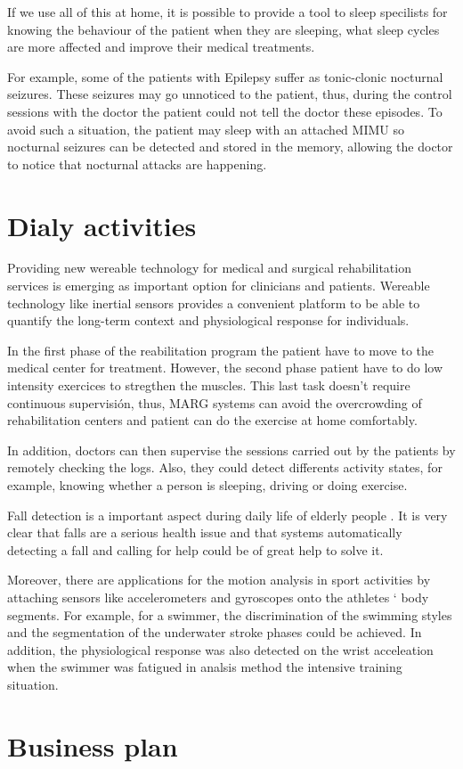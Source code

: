 If we use all of this at home, it is possible to provide a tool to sleep specilists for knowing the behaviour of the patient when they are sleeping, what sleep cycles are more affected and improve their medical  treatments. 

For example,  some of the patients with Epilepsy suffer as tonic-clonic nocturnal seizures. These seizures  may go unnoticed to the patient, thus, during the control sessions with the doctor the patient could not tell the doctor these episodes. To avoid such a situation, the patient may sleep with an attached MIMU so nocturnal seizures can be detected and stored in the memory, allowing the doctor to notice that nocturnal attacks are happening\cite{A.Olivares2013}. 

\section{Dialy activities }
Providing new wereable technology for medical and surgical rehabilitation services is emerging as important option for clinicians and patients. Wereable technology like inertial sensors provides  a convenient platform to be able to quantify the long-term context and physiological response for  individuals\cite{Sung}.

In the first phase of the reabilitation program the patient have to move to the medical center for treatment. However, the second phase patient have to do low intensity exercices to stregthen  the muscles. This last task doesn’t require continuous  supervisión, thus, MARG systems can avoid the overcrowding of rehabilitation centers and patient can do the exercise at home comfortably\cite{A.Olivares2013}.

In addition, doctors can then supervise the sessions carried out by the patients by remotely checking the logs. Also, they could detect differents activity states, for example, knowing whether a person  is sleeping, driving or doing exercise\cite{A.Olivares2013}.

Fall detection is a important aspect during daily life of elderly people . It is very clear that falls are a serious health issue and that systems automatically detecting a fall and calling for help could be of great help to solve it. 

Moreover, there are applications for the motion analysis in sport activities by attaching sensors like accelerometers and gyroscopes onto the athletes ‘  body segments. For example, for a swimmer, the discrimination of the swimming styles and the segmentation of the underwater stroke phases could be achieved. In addition, the physiological response was also detected on the wrist acceleation when the swimmer was fatigued in analsis method the intensive training situation\cite{Yuji}.



\section{Business plan }